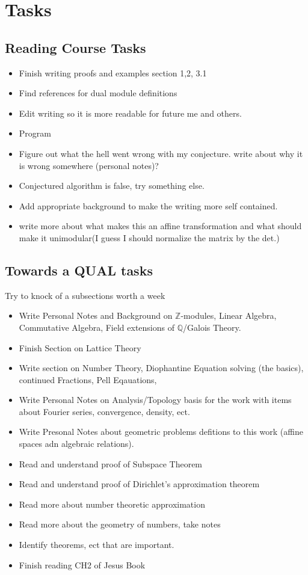 \documentclass{article}
\newcommand{\Z}[0]{\mathbb{Z}}		%
\newcommand{\Q}[0]{\mathbb{Q}}		%
\theoremstyle{definition}
\theoremstyle{remark}
\begin{document}
\section{Tasks}
\subsection{Reading Course Tasks}
\begin{itemize}
    \item Finish writing proofs and examples section 1,2, 3.1
    \item Find references for dual module definitions
    \item Edit writing so it is more readable for future me and others. 
    \item Program 
    \item Figure out what the hell went wrong with my conjecture. write about why it is wrong somewhere (personal notes)?
    \item Conjectured algorithm is false, try something else. 
    \item Add appropriate background to make the writing more self contained.
    \item write more about what makes this an affine transformation and what should make it unimodular(I guess I should normalize the matrix by the det.)
\end{itemize}

\subsection{Towards a QUAL tasks}
Try to knock of a subsections worth a week
\begin{itemize}
    \item Write Personal Notes and Background on $\Z$-modules, Linear Algebra, Commutative Algebra, Field extensions of $\Q$/Galois Theory.
    \item Finish Section on Lattice Theory
    \item Write section on Number Theory, Diophantine Equation solving (the basics), continued Fractions, Pell Eqauations, 
    \item Write Personal Notes on Analysis/Topology basis for the work with items about Fourier series, convergence, density, ect.
    \item Write Presonal Notes about geometric problems defitions to this work (affine spaces adn algebraic relations). 
    \item Read and understand proof of Subspace Theorem
    \item Read and understand proof of Dirichlet's approximation theorem
    \item Read more about number theoretic approximation
    \item Read more about the geometry of numbers, take notes
    \item Identify theorems, ect that are important. 
    \item Finish reading CH2 of Jesus Book
\end{itemize}
\end{document}
